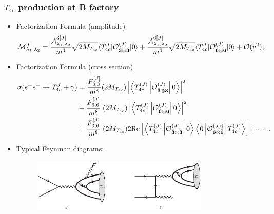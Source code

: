 \begin{frame}
  \frametitle{$T_{4c}$ production at B factory}


  \begin{itemize}
		  \item Factorization Formula (amplitude)
		  \begin{align*}
			\mathcal{M}^J_{\lambda_1,\lambda_2}= \frac{\mathcal{A}^{3[J]}_{\lambda_1,\lambda_2} }{ m^{4}} \sqrt{2 M_{T_{4c}}}
			\langle T_{4 c}^{J} \vert \mathcal{O}^{(J)}_{\mathbf{\bar 3}\otimes\mathbf{3}} \vert 0\rangle +
			\frac{\mathcal{A}^{6[J]}_{\lambda_1,\lambda_2} }{ m^{4}}
			\sqrt{2 M_{T_{4c}}} \langle T_{4 c}^{J}\vert \mathcal{O}^{(J)}_{\mathbf{6}\otimes\mathbf{\bar 6}} \vert 0\rangle+
			{\cal O}(v^2),
		  \end{align*}
    \item Factorization Formula (cross section)
          \begin{align*}
            \sigma(e^+e^-\to T^J_{4c}+\gamma)
   & = {\frac{F^{[J]}_{3,3} }{ m^8} (2 M_{T_{4c}}) }
  \left|\left\langle T_{4 c}^{(J)}\left|\mathcal{O}_{\mathbf{\bar 3}\otimes\mathbf{ 3}}^{(J)}\right|0 \right\rangle\right|^{2}\\
  &+
  {\frac{F^{[J]}_{6,6} }{ m^{8}}}\; (2 M_{T_{4c}}) \left|\left\langle T_{4 c}^{(J)}\left|\mathcal{O}_{\mathbf{6}
   \otimes \bar{\mathbf{6}}}^{(J)}\right| 0\right\rangle \right|^{2}\\
   & +  {\frac{F^{[J]}_{3,6} }{ m^{8}}} \;(2 M_{T_{4c}}) 2{\rm Re}\left[\left\langle T_{4 c}^{(J)}
   \left|\mathcal{O}_{\mathbf{\bar 3}\otimes\mathbf{3}}^{(J)}\right| 0\right\rangle\left
   \langle  0\left|\mathcal{O}_{\mathbf{6} \otimes \bar{\mathbf{6}}}^{(J)\dagger} \right|T_{4 c}^{(J)}\right\rangle\right]+\cdots.
          \end{align*}
    \item Typical Feynman diagrams:
          \begin{figure}
            \centering
            \includegraphics[width=0.8\textwidth,frame]{eeT4c_Feynman_diagrams}
		  \end{figure}
  \end{itemize}

\end{frame}


